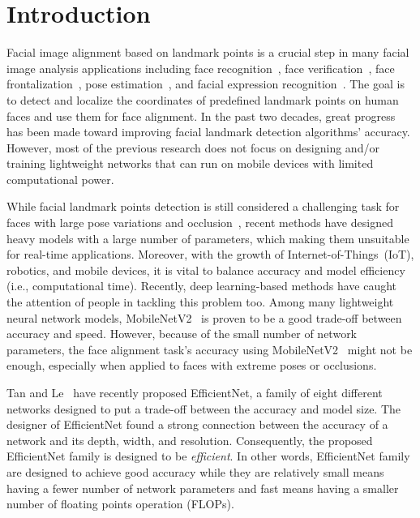 \documentclass[times,twocolumn,final,authoryear]{elsarticle}
\begin{document}
\section{Introduction}\label{sec:intro}
Facial image alignment based on landmark points is a crucial step in many facial image analysis applications including face recognition~\cite{lu2015surpassing, soltanpour2017survey},
face verification~\cite{sun2014deep, sun2013hybrid}, face frontalization~\cite{hassner2015effective}, pose estimation~\cite{vicente2015driver}, and facial expression recognition~\cite{sun2014deep, zhao2003face}. The goal is to detect and localize the coordinates of predefined landmark points on human faces and use them for face alignment. In the past two decades, great progress has been made toward improving facial landmark detection algorithms' accuracy. However, most of the previous research does not focus on designing and/or training lightweight networks that can run on mobile devices with limited computational power.

While facial landmark points detection is still considered a challenging task for faces with large pose variations and occlusion~\cite{dong2018style, wu2018look}, recent methods have designed heavy models with a large number of parameters, which making them unsuitable for real-time applications. Moreover, with the growth of Internet-of-Things~(IoT), robotics, and mobile devices, it is vital to balance accuracy and model efficiency (i.e., computational time). Recently, deep learning-based methods have caught the attention of people in tackling this problem too. Among many lightweight neural network models, MobileNetV2~\cite{sandler2018MobileNetV2} is proven to be a good trade-off between accuracy and speed. However, because of the small number of network parameters, the face alignment task's accuracy using MobileNetV2~\cite{sandler2018MobileNetV2} might not be enough, especially when applied to faces with extreme poses or occlusions. 

Tan and Le~\cite{tan2019efficientnet} have recently proposed EfficientNet, a family of eight different networks designed to put a trade-off between the accuracy and model size. The designer of EfficientNet found a strong connection between the accuracy of a network and its depth, width, and resolution. Consequently, the proposed EfficientNet family is designed to be \textit{efficient}. In other words, EfficientNet family are designed to achieve good accuracy while they are relatively small means having a fewer number of network parameters and fast means having a smaller number of floating points operation (FLOPs).
\end{document}
